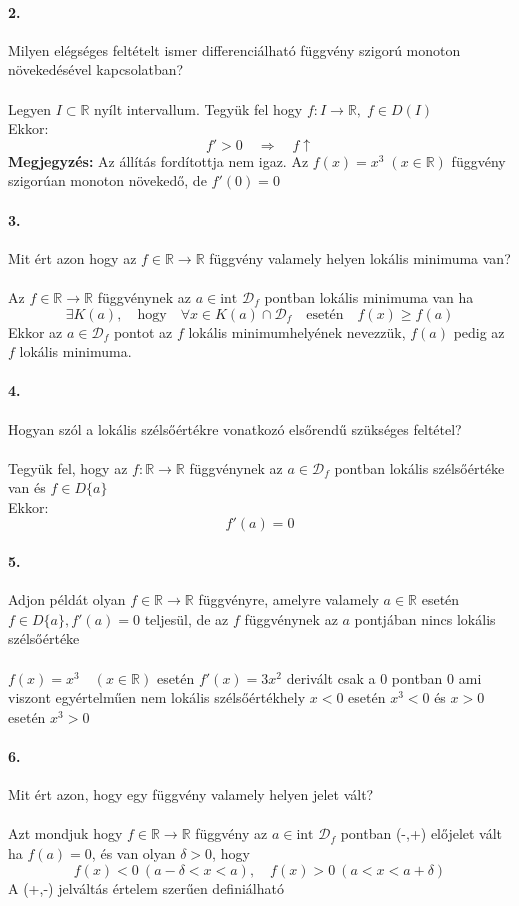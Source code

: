 \documentclass[10pt,a4paper]{article}
\newcommand{\R}{\mathbb{R}}
\newcommand{\D}{\mathcal{D}}
\newcommand{\fR}{f\in\R\rightarrow\R}
\renewcommand{\>}{\rightarrow}
\begin{document}
\paragraph{2.}
Milyen elégséges feltételt ismer differenciálható függvény szigorú monoton növekedésével kapcsolatban?\\\\
Legyen $I \subset \R $ nyílt intervallum. Tegyük fel hogy $f : I \rightarrow \R, \; f\in D(I)$\\ Ekkor:
\[
f'>0 \quad \Rightarrow \quad f\uparrow
\]
\textbf{Megjegyzés:} Az állítás fordítottja nem igaz. Az $f(x)=x^3 \; (x\in\R)$ függvény szigorúan monoton növekedő, de $f'(0)=0$
\paragraph{3.}
Mit ért azon hogy az $f\in\R\rightarrow\R$ függvény valamely helyen lokális minimuma van? \\\\
Az  $\fR$ függvénynek az $a\in \text{int } \D_f$ pontban lokális minimuma van ha 
\[
\exists K(a), \quad \text{hogy} \quad \forall x \in K(a)\cap \D_f \quad \text{esetén} \quad f(x)\geq f(a)
\]
Ekkor az $a\in\D_f$ pontot az $f$ lokális minimumhelyének nevezzük, $f(a)$ pedig az $f$ lokális minimuma.
\paragraph{4.}
Hogyan szól a lokális szélsőértékre vonatkozó elsőrendű szükséges feltétel?\\\\
Tegyük fel, hogy az $f:\R\rightarrow\R$ függvénynek az $a\in\D_f$ pontban lokális szélsőértéke van és $f\in D\{a\}$ \\
Ekkor:
\[
f'(a)=0
\]
\paragraph{5.}
Adjon  példát olyan $\fR$ függvényre, amelyre valamely $a\in\R$ esetén $f\in D\{a\} , f'(a)=0$ teljesül, de az $f$ függvénynek az $a$ pontjában nincs lokális szélsőértéke \\\\

$f(x)=x^3 \quad (x\in\R)$  esetén $f'(x)=3x^2$ derivált csak a $0$ pontban $0$ ami viszont egyértelműen nem lokális szélsőértékhely $x<0$ esetén $x^3 < 0$ és $x>0$ esetén $x^3>0$

\paragraph{6.}
Mit ért azon, hogy egy függvény valamely helyen jelet vált? \\\\
Azt mondjuk hogy $\fR$ függvény az $a \in \text{int }\D_f$ pontban (-,+) előjelet vált ha $f(a)=0$, és van olyan $\delta >0$, hogy
\[
f(x)<0 \: (a-\delta <x < a), \quad f(x)>0 \: (a<x<a+\delta)
\]
A (+,-) jelváltás értelem szerűen  definiálható
\end{document}
